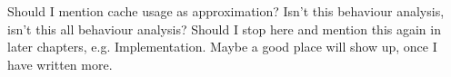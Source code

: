 Should I mention cache usage as approximation? Isn't this behaviour analysis,
isn't this all behaviour analysis?
Should I stop here and mention this again in later chapters, e.g.
Implementation. Maybe a good place will show up, once I have written more.


\begin{comment}
\paragraph{performance expectation}
But how can a performance expectation be formulated, without offline
measurements or a separate online measurement phase?
If a thread is scheduled the first time, no performance or resource information
is available.
The thread can be placed on the core with the least threads or with the lowest
cache weight. \todo{did I explain cache weight already?}
At the next interval boundary, the thread is measured and a performance
prediction is formulated.
Based on this prediction the thread can be placed by the chosen scheme,
e.g. cache weight.

\paragraph{performance measurement}
But does this measurement at interval boundaries actually describe the
performance of the co-schedule?
Three cases must be considered during an interval:
(A) a thread runs solo on a physical core,
(B) a thread runs together with one other thread on a physical core and each
thread executes on one logical core, and
(C) more than two threads run on the same physical core.
In case (A), the measurement describes the solo execution performance and
resource usage.
Case (B)'s measurement actually provides the co-schedule performance for both
threads.
And case (C) provides no reliable information at all.
If three threads are present, two of them, say \alpha{} and \beta{}, are assumed to
execute in parallel at each point in time.
During the interval the combination will change, so \alpha{} and \gamma{} will be
co-scheduled for some time and likewise \beta{} and \gamma{} and \alpha{} and
\beta{}.
The measurement takes place at the end of an interval, with no information
about how long which thread combination was executing together. So no
co-schedule performance statement for each pair of threads can be made.

This example is simplified to ease the argumentation, in reality two additional
problems must be considered.
First, the \gls{llc} of the target hardare is shared among all four physical cores,
hence the performance of each core local co-schedule is influenced by
co-schedules on other cores, too.
Second, the possible thread combinations are either (\alpha, \beta) and
(\gamma, \beta), (\alpha, \beta) and (\alpha, \gamma), or (\alpha, \gamma) and
(\beta, \gamma), because no scheduling decisions take place during an interval.
\todo{make it clear, that each combination is the result of the last
assignment?}
So one of the three threads can execute for the whole interval and the other
two execute for half an interval each.


\end{comment}

